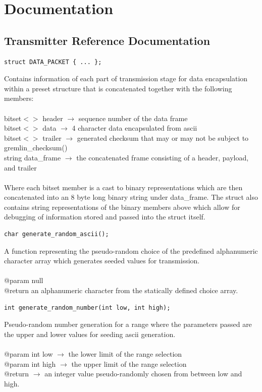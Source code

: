 \documentclass[12pt]{article}
\begin{document}
\section{Documentation}
\subsection{Transmitter Reference Documentation}
\begin{lstlisting}
struct DATA_PACKET { ... };
\end{lstlisting}
Contains information of each part of transmission stage for data encapsulation within a preset structure that is concatenated together with the following members:\\\\
bitset$<>$ header 	$\rightarrow$	sequence number of the data frame\\
bitset$<>$ data		$\rightarrow$	4 character data encapsulated from ascii\\
bitset$<>$ trailer	$\rightarrow$	generated checksum that may or may not be subject to gremlin\_checksum()\\
string data\_frame	$\rightarrow$	the concatenated frame consisting of a header, payload, and trailer\\\\
Where each bitset member is a cast to binary representations which are then concatenated into an 8 byte long binary string under data\_frame. The struct also contains string representations of the binary members above which allow for debugging of information stored and passed into the struct itself.

\begin{lstlisting}
char generate_random_ascii();
\end{lstlisting}
A function representing the pseudo-random choice of the predefined alphanumeric character array which generates seeded values for transmission.\\\\
@param null\\
@return an alphanumeric character from the statically defined choice array.

\begin{lstlisting}
int generate_random_number(int low, int high);
\end{lstlisting}
Pseudo-random number generation for a range where the parameters passed are the upper and lower values for seeding ascii generation.\\\\
@param int low $\rightarrow$ the lower limit of the range selection\\
@param int high $\rightarrow$ the upper limit of the range selection\\
@return $\rightarrow$ an integer value pseudo-randomly chosen from between low and high.
\end{document}
